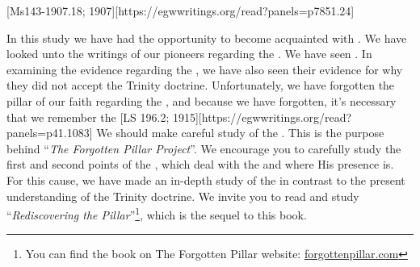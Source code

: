 [Ms143-1907.18; 1907][https://egwwritings.org/read?panels=p7851.24]


In this study we have had the opportunity to become acquainted with . We have looked unto the writings of our pioneers regarding the . We have seen . In examining the evidence regarding the , we have also seen their evidence for why they did not accept the Trinity doctrine. Unfortunately, we have forgotten the pillar of our faith regarding the , and because we have forgotten, it’s necessary that we remember the [LS 196.2; 1915][https://egwwritings.org/read?panels=p41.1083] We should make careful study of the . This is the purpose behind “\textit{The Forgotten Pillar Project}”. We encourage you to carefully study the first and second points of the , which deal with the  and where His presence is. For this cause, we have made an in-depth study of the  in contrast to the present understanding of the Trinity doctrine. We invite you to read and study “\textit{Rediscovering the Pillar}”\footnote{You can find the book on The Forgotten Pillar website: \href{http://forgottenpillar.com}{forgottenpillar.com}}, which is the sequel to this book.



